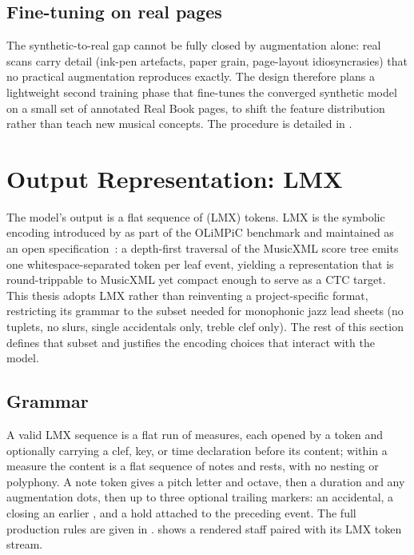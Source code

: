 \subsection{Fine-tuning on real pages}

The synthetic-to-real gap cannot be fully closed by augmentation
alone: real scans carry detail (ink-pen artefacts, paper grain,
page-layout idiosyncrasies) that no practical augmentation reproduces
exactly. The design therefore plans a lightweight second training
phase that fine-tunes the converged synthetic model on a small set of
annotated Real Book pages, to shift the feature distribution rather
than teach new musical concepts. The procedure is detailed in
.

\section{Output Representation: LMX}
\label{sec:lmx-format}

The model's output is a flat sequence of 
(LMX) tokens. LMX is the symbolic encoding introduced by
\textcite{mayerPracticalEndToEnd2024} as part of the OLiMPiC
benchmark and maintained as an open
specification~\cite{OMRResearchLmx2025}: a depth-first traversal of
the MusicXML score tree emits one whitespace-separated token per leaf
event, yielding a representation that is round-trippable to MusicXML
yet compact enough to serve as a CTC target.
This thesis adopts LMX rather than reinventing a project-specific
format, restricting its grammar to the subset needed for monophonic
jazz lead sheets (no tuplets, no slurs, single accidentals only,
treble clef only).
The rest of this section defines that subset and justifies the
encoding choices that interact with the model.

\subsection{Grammar}

A valid LMX sequence is a flat run of measures, each opened by a
 token and optionally carrying a clef, key, or time
declaration before its content; within a measure the content is a flat
sequence of notes and rests, with no nesting or polyphony.
A note token gives a pitch letter and octave, then a duration and any
augmentation dots, then up to three optional trailing markers: an
accidental, a  closing an earlier ,
and a  hold attached to the preceding event. The full
production rules are given in .
 shows a rendered staff paired with its LMX
token stream.

